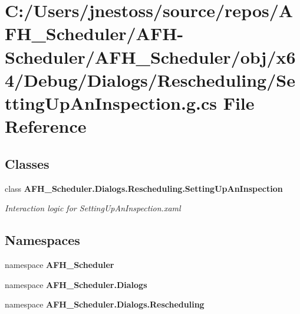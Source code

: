 \section{C\+:/\+Users/jnestoss/source/repos/\+A\+F\+H\+\_\+\+Scheduler/\+A\+F\+H-\/\+Scheduler/\+A\+F\+H\+\_\+\+Scheduler/obj/x64/\+Debug/\+Dialogs/\+Rescheduling/\+Setting\+Up\+An\+Inspection.g.\+cs File Reference}
\label{x64_2_debug_2_dialogs_2_rescheduling_2_setting_up_an_inspection_8g_8cs}
\subsection*{Classes}
\begin{DoxyCompactItemize}
\item 
class \textbf{ A\+F\+H\+\_\+\+Scheduler.\+Dialogs.\+Rescheduling.\+Setting\+Up\+An\+Inspection}
\begin{DoxyCompactList}\small\item\em Interaction logic for Setting\+Up\+An\+Inspection.\+xaml \end{DoxyCompactList}\end{DoxyCompactItemize}
\subsection*{Namespaces}
\begin{DoxyCompactItemize}
\item 
namespace \textbf{ A\+F\+H\+\_\+\+Scheduler}
\item 
namespace \textbf{ A\+F\+H\+\_\+\+Scheduler.\+Dialogs}
\item 
namespace \textbf{ A\+F\+H\+\_\+\+Scheduler.\+Dialogs.\+Rescheduling}
\end{DoxyCompactItemize}
